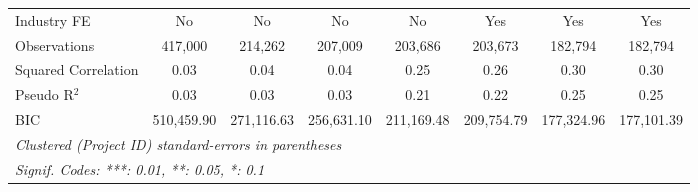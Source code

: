 \documentclass[
]{article}
\begin{document}
\begin{table}[htbp]
\begin{tabular}{lccccccc}
      Industry FE                         & No             & No             & No            & No            & Yes           & Yes           & Yes\\  
      Observations                        & 417,000        & 214,262        & 207,009       & 203,686       & 203,673       & 182,794       & 182,794\\  
      Squared Correlation                 & 0.03           & 0.04           & 0.04          & 0.25          & 0.26          & 0.30          & 0.30\\  
      Pseudo R$^2$                        & 0.03           & 0.03           & 0.03          & 0.21          & 0.22          & 0.25          & 0.25\\  
      BIC                                 & 510,459.90     & 271,116.63     & 256,631.10    & 211,169.48    & 209,754.79    & 177,324.96    & 177,101.39\\  
      \midrule
      \multicolumn{8}{l}{\emph{Clustered (Project ID) standard-errors in parentheses}}\\
      \multicolumn{8}{l}{\emph{Signif. Codes: ***: 0.01, **: 0.05, *: 0.1}}\\
   \end{tabular}
\end{table}
\begingroup
\centering
\small
\end{document}
